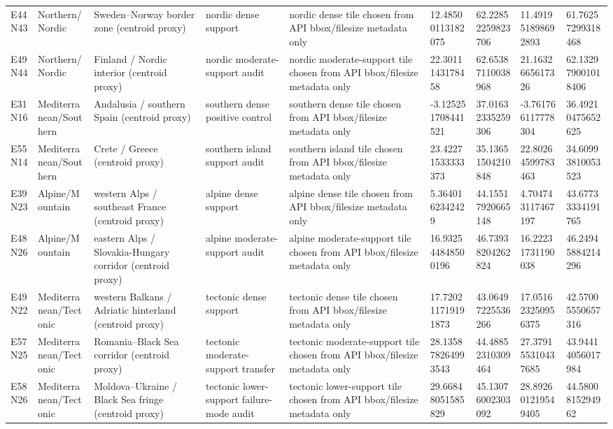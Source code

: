 \begin{landscape}
\begin{longtable}{lllllllll}
E44N43 & Northern/Nordic & Sweden–Norway border zone (centroid proxy) & nordic dense support & nordic dense tile chosen from API bbox/filesize metadata only & 12.48500113182075 & 62.22852259823706 & 11.491951898692893 & 61.76257299318468 \\
E49N44 & Northern/Nordic & Finland / Nordic interior (centroid proxy) & nordic moderate-support audit & nordic moderate-support tile chosen from API bbox/filesize metadata only & 22.3011143178458 & 62.65387110038968 & 21.1632665617326 & 62.132979001018406 \\
E31N16 & Mediterranean/Southern & Andalusia / southern Spain (centroid proxy) & southern dense positive control & southern dense tile chosen from API bbox/filesize metadata only & -3.125251708441521 & 37.01632335259306 & -3.761766117778304 & 36.49210475652625 \\
E55N14 & Mediterranean/Southern & Crete / Greece (centroid proxy) & southern island support audit & southern island tile chosen from API bbox/filesize metadata only & 23.42271533333373 & 35.13651504210848 & 22.80264599783463 & 34.60993810053523 \\
E39N23 & Alpine/Mountain & western Alps / southeast France (centroid proxy) & alpine dense support & alpine dense tile chosen from API bbox/filesize metadata only & 5.3640162342429 & 44.15517920665148 & 4.704743117467197 & 43.67733334191765 \\
E48N26 & Alpine/Mountain & eastern Alps / Slovakia-Hungary corridor (centroid proxy) & alpine moderate-support audit & alpine moderate-support tile chosen from API bbox/filesize metadata only & 16.932544848500196 & 46.73938204262824 & 16.22231731190038 & 46.24945884214296 \\
E49N22 & Mediterranean/Tectonic & western Balkans / Adriatic hinterland (centroid proxy) & tectonic dense support & tectonic dense tile chosen from API bbox/filesize metadata only & 17.720211719191873 & 43.06497225536266 & 17.051623250956375 & 42.57005550657316 \\
E57N25 & Mediterranean/Tectonic & Romania–Black Sea corridor (centroid proxy) & tectonic moderate-support transfer & tectonic moderate-support tile chosen from API bbox/filesize metadata only & 28.135878264993543 & 44.48852310309464 & 27.379155310437685 & 43.94414056017984 \\
E58N26 & Mediterranean/Tectonic & Moldova–Ukraine / Black Sea fringe (centroid proxy) & tectonic lower-support failure-mode audit & tectonic lower-support tile chosen from API bbox/filesize metadata only & 29.66848051585829 & 45.13076002303092 & 28.892601219549405 & 44.5800815294962 \\
\bottomrule
\end{longtable}
\end{landscape}

